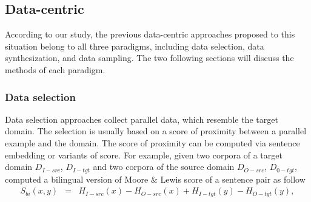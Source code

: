 \subsection{Data-centric}
\label{ssec:case-2-data}
According to our study, the previous data-centric approaches proposed to this situation belong to all three paradigms, including data selection, data synthesization, and data sampling. The two following sections will discuss the methods of each paradigm.
\subsubsection{Data selection}
Data selection approaches collect parallel data, which resemble the target domain. The selection is usually based on a score of proximity between a parallel example and the domain. The score of proximity can be computed via sentence embedding or variants of \citeauthor{Moore10intelligent} score. For example, given two corpora of a target domain $D_{I-src}$, $D_{I-tgt}$ and two corpora of the source domain $D_{O-src}$, $D_{0-tgt}$, \citet{Axelrod11domain} computed a bilingual version of Moore $\&$ Lewis score of a sentence pair as follow
\begin{equation}
\begin{array}{rcl}
S_{bi} (x,y) &=& H_{I-src}(x) - H_{O-src}(x) + H_{I-tgt}(y) - H_{O-tgt}(y), \\
\end{array}
\label{eq:ced}
\end{equation}
